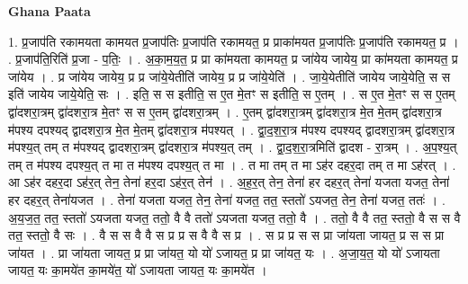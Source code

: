 \documentclass[17pt]{extarticle}
\begin{document}
\textbf{Ghana Paata } \newline

1. प्र॒जाप॑ति रकामयता कामयत प्र॒जाप॑तिः प्र॒जाप॑ति रकामयत॒ प्र प्राका॑मयत प्र॒जाप॑तिः प्र॒जाप॑ति रकामयत॒ प्र । . प्र॒जाप॑ति॒रिति॑ प्र॒जा - प॒तिः॒ । . अ॒का॒म॒य॒त॒ प्र प्रा का॑मयता कामयत॒ प्र जा॑येय जायेय॒ प्रा का॑मयता कामयत॒ प्र जा॑येय । . प्र जा॑येय जायेय॒ प्र प्र जा॑ये॒येतीति॑ जायेय॒ प्र प्र जा॑ये॒येति॑ । . जा॒ये॒येतीति॑ जायेय जाये॒येति॒ स स इति॑ जायेय जाये॒येति॒ सः । . इति॒ स स इतीति॒ स ए॒त मे॒तꣳ स इतीति॒ स ए॒तम् । . स ए॒त मे॒तꣳ स स ए॒तम् द्वा॑दशरा॒त्रम् द्वा॑दशरा॒त्र मे॒तꣳ स स ए॒तम् द्वा॑दशरा॒त्रम् । . ए॒तम् द्वा॑दशरा॒त्रम् द्वा॑दशरा॒त्र मे॒त मे॒तम् द्वा॑दशरा॒त्र म॑पश्य दपश्यद् द्वादशरा॒त्र मे॒त मे॒तम् द्वा॑दशरा॒त्र म॑पश्यत् । . द्वा॒द॒श॒रा॒त्र म॑पश्य दपश्यद् द्वादशरा॒त्रम् द्वा॑दशरा॒त्र म॑पश्य॒त् तम् त म॑पश्यद् द्वादशरा॒त्रम् द्वा॑दशरा॒त्र म॑पश्य॒त् तम् । . द्वा॒द॒श॒रा॒त्रमिति॑ द्वादश - रा॒त्रम् । . अ॒प॒श्य॒त् तम् त म॑पश्य दपश्य॒त् त मा त म॑पश्य दपश्य॒त् त मा । . त मा तम् त मा ऽह॑र दहर॒दा तम् त मा ऽह॑रत् । . आ ऽह॑र दहर॒दा ऽह॑र॒त् तेन॒ तेना॑ हर॒दा ऽह॑र॒त् तेन॑ । . अ॒ह॒र॒त् तेन॒ तेना॑ हर दहर॒त् तेना॑ यजता यजत॒ तेना॑ हर दहर॒त् तेना॑यजत । . तेना॑ यजता यजत॒ तेन॒ तेना॑ यजत॒ तत॒ स्ततो॑ ऽयजत॒ तेन॒ तेना॑ यजत॒ ततः॑ । . अ॒य॒ज॒त॒ तत॒ स्ततो॑ ऽयजता यजत॒ ततो॒ वै वै ततो॑ ऽयजता यजत॒ ततो॒ वै । . ततो॒ वै वै तत॒ स्ततो॒ वै स स वै तत॒ स्ततो॒ वै सः । . वै स स वै वै स प्र प्र स वै वै स प्र । . स प्र प्र स स प्रा जा॑यता जायत॒ प्र स स प्रा जा॑यत । . प्रा जा॑यता जायत॒ प्र प्रा जा॑यत॒ यो यो॑ ऽजायत॒ प्र प्रा जा॑यत॒ यः । . अ॒जा॒य॒त॒ यो यो॑ ऽजायता जायत॒ यः का॒मये॑त का॒मये॑त॒ यो॑ ऽजायता जायत॒ यः का॒मये॑त । \newline
\end{document}
